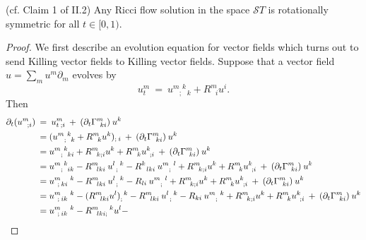 \begin{lemma}
  \label{lem:kl-rotational-symmetry-standard-solutions-standard-solutions-lemma}
 (cf. Claim 1 of II.2)
Any Ricci flow solution in the space ${\mathcal ST}$ is
rotationally symmetric for all $t \in [0,1)$.
\end{lemma}
\begin{proof}
We first describe an evolution equation for vector fields which
turns out to send Killing vector fields to Killing vector fields.
Suppose that a vector field $u = \sum_m u^m \partial_m$ evolves by
\begin{equation} \label{Killingevolution}
u^m_t \: = \:
u^{m \: \: k}_{\: \: \: \: ;\: \: \:  k} + R^m_{\: \: \: i} u^i.
\end{equation}
Then
\begin{align} \label{bigmess1}
\partial_t (u^m_{\: \: \: ; i}) \: & = \:  u^m_{t \: ; i} \: + \:
(\partial_t \Gamma^m_{\: \: ki}) \: u^k \\
& = (u^{m \: \: k}_{\: \:
\: \: ;\: \: \:  k} + R^m_{\: \: \: k} u^k)_{; \: i} \: + \:
(\partial_t \Gamma^m_{\: \: ki}) \: u^k \notag \\
& = u^{m \: \: k}_{\: \: \: \: ;\: \: \:  ki} + R^m_{\: \: \: k;i} u^k +
R^m_{\: \: \: k} u^k_{\: \: ;i} \: + \:
(\partial_t \Gamma^m_{\: \: ki}) \: u^k \notag \\
& = u^{m \: \: k}_{\: \: \: \: ;\: \: \:  ik} -
R^m_{\: \: \: lki} \: u^{l \: \: \: k}_{\: \: ;} - R^k_{\: \: \: lki} \:
u^{m \: \: \: l}_{\: \: \: \: ;}
+ R^m_{\: \: \: k;i} u^k +
R^m_{\: \: \: k} u^k_{\: \: ;i} \: + \:
(\partial_t \Gamma^m_{\: \: ki}) \: u^k \notag \\
& = u^{m \: \: \: \: \: \: k}_{\: \: ;\:ki} -
R^m_{\: \: \: lki} \: u^{l \: \: \: k}_{\: \: ;} - R_{li} \:
u^{m \: \: \: l}_{\: \: \: \: ;}
+ R^m_{\: \: \: k;i} u^k +
R^m_{\: \: \: k} u^k_{\: \: ;i} \: + \:
(\partial_t \Gamma^m_{\: \: ki}) \: u^k \notag \\
& = u^{m \: \: \: \: \: \: k}_{\: \: ;\:ik} -
(R^m_{\: \: \: lki} u^l)_;^{\: \: k} -
R^m_{\: \: \: lki} \: u^{l \: \: \: k}_{\: \: ;} - R_{ki} \:
u^{m \: \: \: k}_{\: \: \: \: ;}
+ R^m_{\: \: \: k;i} u^k +
R^m_{\: \: \: k} u^k_{\: \: ;i} \: + \:
(\partial_t \Gamma^m_{\: \: ki}) \: u^k \notag \\
& = u^{m \: \: \: \: \: \: k}_{\: \: ;\:ik} -
R^{m \: \: \: \: \: \: \: k}_{\: \: \: lki;} u^l -

\end{align}
\end{proof}
